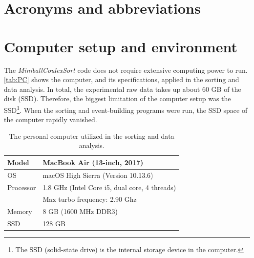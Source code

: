 \documentclass[twoside,english]{uiofysmaster/uiofysmaster}
\let\orgautoref\autoref
\renewcommand{\autoref}
        {%
		 \def\sectionautorefname{Section}%
		 \def\subsectionautorefname{Section}%
		 \def\subsubsectionautorefname{Section}%
		 \def\chapterautorefname{Chapter}%
          \orgautoref}
\begin{document}
\begin{appendices}

\chapter{Acronyms and abbreviations}\label{ch:acronyms}

\begin{table}[ht] 
	\centering 
	
	\label{tab:acro}
\end{table}




\chapter{Computer setup and environment}\label{a:computer_environment}
The \textsl{MiniballCoulexSort} code does not require extensive computing power to run. 
\autoref{tab:PC} shows the computer, and its specifications, applied in the sorting and data analysis. 
In total, the experimental raw data takes up about 60 GB of the disk (SSD). 
Therefore, the biggest limitation of the computer setup was the SSD\footnote{The SSD (solid-state drive) is the internal storage device in the computer.}. 
When the sorting and event-building programs were run, the SSD space of the computer rapidly vanished. 

\begin{table}[ht] 
	\centering 
	\caption{The personal computer utilized in the sorting and data analysis.}
	\label{tab:PC}
	\begin{tabular}{ll}
		\hline
		Model & MacBook Air (13-inch, 2017) \\
		\hline
		OS              & macOS High Sierra (Version 10.13.6) \\
		Processor  &  1.8 GHz (Intel Core i5, dual core, 4 threads)  \\
						 &  Max turbo frequency: 2.90 Ghz  \\
		Memory     &  8 GB (1600 MHz DDR3)  \\
		SSD		     &  128 GB  \\
		\hline
	\end{tabular}
\end{table}


\end{appendices}
\end{document}
